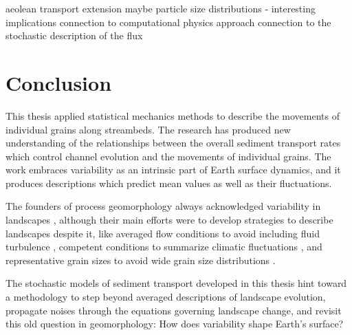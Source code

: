 aeolean transport extension maybe
particle size distributions - interesting implications
connection to computational physics approach
connection to the stochastic description of the flux

\section{Conclusion}

This thesis applied statistical mechanics methods to describe the movements of individual grains along streambeds.
The research has produced new understanding of the relationships between the overall sediment transport rates which control channel evolution and the movements of individual grains. The work embraces variability as an intrinsic part of Earth surface dynamics, and it produces descriptions which predict mean values as well as their fluctuations. 

The founders of process geomorphology always acknowledged variability in landscapes \citep{Horton1945,Strahler1952,Langbein1964}, although their main efforts were to develop strategies to describe landscapes despite it, like averaged flow conditions to avoid including fluid turbulence \citep{MeyerPeter1948,Bagnold1954}, competent conditions to summarize climatic fluctuations \citep{Wolman1959,Wolman1978}, and representative grain sizes to avoid wide grain size distributions \citep{Parker1982,Andrews1983}.

The stochastic models of sediment transport developed in this thesis hint toward a methodology to step beyond averaged descriptions of landscape evolution, propagate noises through the equations governing landscape change, and revisit this old question in geomorphology: How does variability shape Earth's surface?

